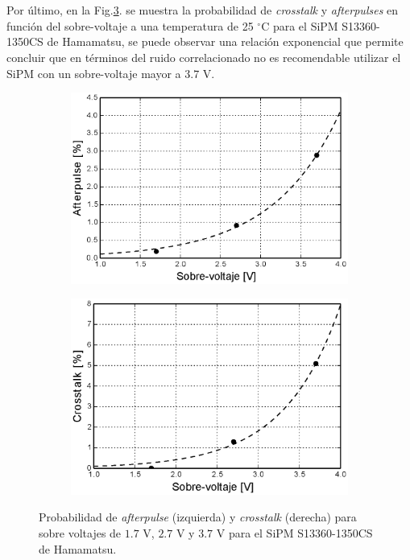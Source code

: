 \\ \\
Por último, en la Fig.\ref{fig:Noise_vs_Ov}. se muestra la probabilidad de \textit{crosstalk} y  \textit{afterpulses} en función del sobre-voltaje a una temperatura de 25 $^\circ$C para el SiPM S13360-1350CS de Hamamatsu, se puede observar una relación exponencial que permite concluir que en términos del ruido correlacionado no es recomendable utilizar el SiPM con un sobre-voltaje mayor a $3.7$ V.

\begin{figure}[ht!]
     \centering
     \begin{subfigure}[b]{0.49\textwidth}
         \centering
         \includegraphics[width=1.1\textwidth]{Images/After_vs_Ov_1350CS.eps}
         \caption{}
         \label{fig:After_vs_Ov}
     \end{subfigure}
     \begin{subfigure}[b]{0.49\textwidth}
         \centering
         \includegraphics[width=1.1\textwidth]{Images/Cross_vs_Ov_1350CS.eps}
         \caption{}
         \label{fig:Cross_vs_Ov}
     \end{subfigure}
        \caption{Probabilidad de \textit{afterpulse} (izquierda) y \textit{crosstalk} (derecha) para sobre voltajes de $1.7$ V, $2.7$ V y $3.7$ V para el SiPM S13360-1350CS de Hamamatsu.}
        \label{fig:Noise_vs_Ov}
\end{figure}